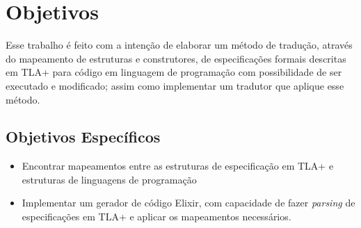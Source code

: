 \section{Objetivos}

Esse trabalho é feito com a intenção de elaborar um método de tradução, através do mapeamento de estruturas e construtores, de especificações formais descritas em TLA+ para código em linguagem de programação com possibilidade de ser executado e modificado; assim como implementar um tradutor que aplique esse método.

\subsection{Objetivos Específicos}
\begin{itemize}
  \item Encontrar mapeamentos entre as estruturas de especificação em TLA+ e estruturas de linguagens de programação
  \item Implementar um gerador de código Elixir, com capacidade de fazer \textit{parsing} de especificações em TLA+ e aplicar os mapeamentos necessários.
\end{itemize}
